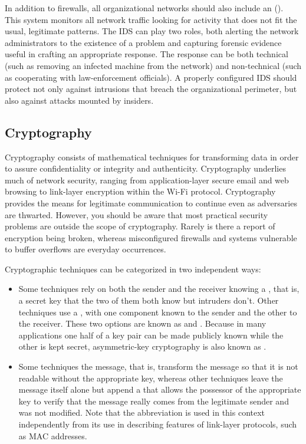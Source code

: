 In addition to firewalls, all organizational networks should also
include an  ().  This
system monitors all network traffic looking for activity that does not
fit the usual, legitimate patterns.  The IDS can play two roles, both
alerting the network administrators to the existence of a problem and
capturing forensic evidence useful in crafting an appropriate
response.  The response can be both technical (such as removing an
infected machine from the network) and non-technical (such as
cooperating with law-enforcement officials).  A properly configured
IDS should protect not only against intrusions that breach the
organizational perimeter, but also against attacks mounted by insiders.

\subsection{Cryptography}

Cryptography consists of mathematical techniques for transforming data
in order to assure confidentiality or integrity and authenticity.
Cryptography underlies much of network security, ranging from
application-layer secure email and web browsing to link-layer
encryption within the Wi-Fi protocol.  Cryptography provides the means
for legitimate communication to continue even as adversaries are
thwarted.  However, you should be aware that most practical security
problems are outside the scope of cryptography.  Rarely is there a
report of encryption being broken, whereas misconfigured
firewalls and systems vulnerable to buffer overflows are everyday
occurrences.

Cryptographic techniques can be categorized in two independent ways:
\begin{itemize}
\item
Some techniques rely on both the sender and the receiver knowing a
, that is, a secret key that the two of them
both know but intruders don't.  Other techniques use a , with one component known to the sender and the other to the
receiver.  These two options are known as
 and
.  Because in many
applications one half of a key pair can be made publicly known while
the other is kept secret, asymmetric-key cryptography is also known as
.
\item
Some techniques  the message, that is,
transform the message so that it is not readable
without the appropriate key, whereas other techniques leave the
message itself alone but append a 
that allows the possessor of the appropriate key to verify that the
message really comes from the legitimate sender and was not modified.
Note that the abbreviation  is used in this context independently
from its use in describing features of link-layer protocols, such as MAC
addresses.
\end{itemize}

